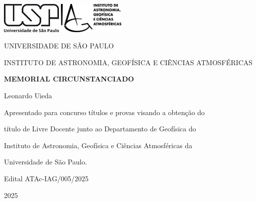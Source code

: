 \documentclass[12pt,a4paper,oneside]{book}
\newcommand{\Year}{2025}
\newcommand{\Author}{Leonardo Uieda}
\newcommand{\Title}{Memorial circunstanciado}
\begin{document}
\pagestyle{plain}
\frontmatter


\begin{titlepage}
  \begin{center}
    \includegraphics[height=1.5cm]{images/usp.png}
    \hspace{1cm}
    \includegraphics[height=1.5cm]{images/iag.png}
    \vspace{1cm}

    UNIVERSIDADE DE SÃO PAULO

    INSTITUTO DE ASTRONOMIA, GEOFÍSICA E CIÊNCIAS ATMOSFÉRICAS
    \vspace{5cm}

    \textbf{\huge \MakeUppercase{\Title}}
    \vspace{2cm}

    {\Large \Author}
    \vspace{5cm}

    {\small
      Apresentado para concurso títulos e provas visando a obtenção do

      título de Livre Docente junto ao Departamento de Geofísica do

      Instituto de Astronomia, Geofísica e Ciências Atmosféricas da

      Universidade de São Paulo.
      \vspace{1cm}

      Edital ATAc-IAG/005/2025
    }
    \vfill

    \Year{}
  \end{center}
\end{titlepage}
\end{document}
